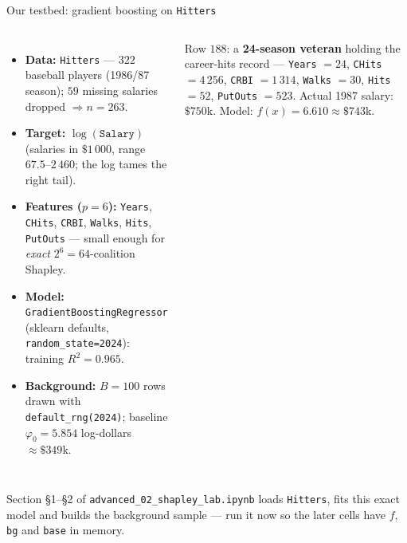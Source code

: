 \documentclass[aspectratio=169,11pt]{beamer}
\begin{document}
\begin{frame}{Our testbed: gradient boosting on \texttt{Hitters}}
  \footnotesize
  \begin{columns}[T]
    \begin{itemize}
      \item \textbf{Data:} \texttt{Hitters} --- $322$ baseball players (1986/87
            season); $59$ missing salaries dropped $\Rightarrow n=263$.
      \item \textbf{Target:} $\log(\texttt{Salary})$ (salaries in $\$1\,000$,
            range $67.5$--$2\,460$; the log tames the right tail).
      \item \textbf{Features ($p=6$):} \texttt{Years}, \texttt{CHits},
            \texttt{CRBI}, \texttt{Walks}, \texttt{Hits}, \texttt{PutOuts} ---
            small enough for \emph{exact} $2^6=64$-coalition Shapley.
      \item \textbf{Model:} \texttt{GradientBoostingRegressor} (sklearn defaults,
            \texttt{random\_state=2024}): training $R^2 = 0.965$.
      \item \textbf{Background:} $B=100$ rows drawn with
            \texttt{default\_rng(2024)}; baseline
            $\varphi_0 = 5.854$ log-dollars $\approx \$349$k.
    \end{itemize}
    \begin{numexample}
      Row $188$: a \textbf{24-season veteran} holding the career-hits record ---
      \texttt{Years} $=24$, \texttt{CHits} $=4\,256$, \texttt{CRBI} $=1\,314$,
      \texttt{Walks} $=30$, \texttt{Hits} $=52$, \texttt{PutOuts} $=523$.
      Actual 1987 salary: $\$750$k. Model: $f(x)=6.610 \approx \$743$k.
    \end{numexample}
  \end{columns}
  \vspace{2pt}
  \begin{labnote}
    Section \S1--\S2 of \texttt{advanced\_02\_shapley\_lab.ipynb} loads
    \texttt{Hitters}, fits this exact model and builds the background sample ---
    run it now so the later cells have $f$, \texttt{bg} and \texttt{base} in memory.
  \end{labnote}
\end{frame}
\end{document}
